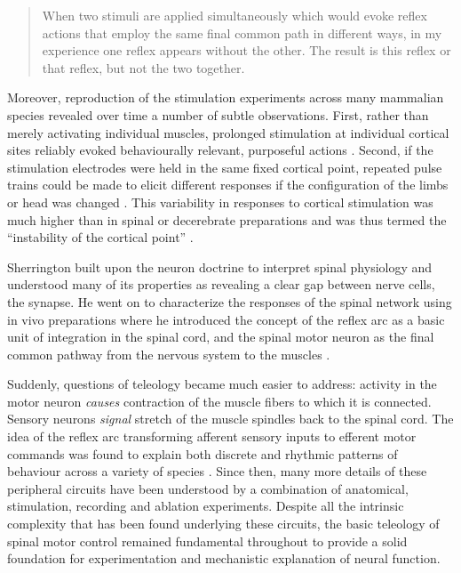 \blockquote[{\protect\cite[p.461]{Sherrington1904}}]{When two stimuli are applied simultaneously which would evoke reflex actions that employ the same final common path in different ways, in my experience one reflex appears without the other. The result is this reflex or that reflex, but not the two together.}



Moreover, reproduction of the stimulation experiments across many mammalian species \cite{Ferrier1873,Clark1937} revealed over time a number of subtle observations. First, rather than merely activating individual muscles, prolonged stimulation at individual cortical sites reliably evoked behaviourally relevant, purposeful actions \cite{Ferrier1873,Clark1937}. Second, if the stimulation electrodes were held in the same fixed cortical point, repeated pulse trains could be made to elicit different responses if the configuration of the limbs or head was changed \cite{Ward1938}. This variability in responses to cortical stimulation was much higher than in spinal or decerebrate preparations and was thus termed the ``instability of the cortical point'' \cite{Brown1912,Leyton1917}.

Sherrington built upon the neuron doctrine to interpret spinal physiology and understood many of its properties as revealing a clear gap between nerve cells, the synapse. He went on to characterize the responses of the spinal network using in vivo preparations where he introduced the concept of the reflex arc as a basic unit of integration in the spinal cord, and the spinal motor neuron as the final common pathway from the nervous system to the muscles \cite{Sherrington1906}.

Suddenly, questions of teleology became much easier to address: activity in the motor neuron \emph{causes} contraction of the muscle fibers to which it is connected. Sensory neurons \emph{signal} stretch of the muscle spindles back to the spinal cord. The idea of the reflex arc transforming afferent sensory inputs to efferent motor commands was found to explain both discrete and rhythmic patterns of behaviour across a variety of species \cite{Sherrington1893b}. Since then, many more details of these peripheral circuits have been understood by a combination of anatomical, stimulation, recording and ablation experiments. Despite all the intrinsic complexity that has been found underlying these circuits, the basic teleology of spinal motor control remained fundamental throughout to provide a solid foundation for experimentation and mechanistic explanation of neural function.

